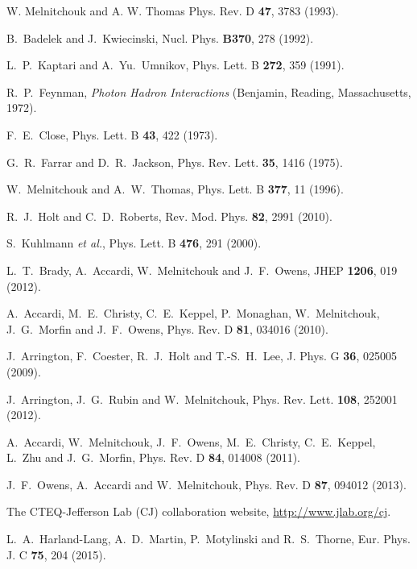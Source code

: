 \documentclass[aps,prd,amsmath,preprint]{revtex4}
\begin{document}
\begin{thebibliography}{99}

W. Melnitchouk and A. W. Thomas
Phys. Rev. D {\bf 47}, 3783 (1993).

B.~Badelek and J.~Kwiecinski,
Nucl. Phys. {\bf B370}, 278 (1992).

L.~P.~Kaptari and A.~Yu.~Umnikov,
Phys. Lett. B {\bf 272}, 359 (1991).

R.~P.~Feynman, {\em Photon Hadron Interactions}
(Benjamin, Reading, Massachusetts, 1972).

F.~E.~Close,
Phys. Lett. B {\bf 43}, 422 (1973).

G.~R.~Farrar and D.~R.~Jackson,
Phys. Rev. Lett. {\bf 35}, 1416 (1975).

W.~Melnitchouk and A.~W.~Thomas,
Phys. Lett. B {\bf 377}, 11 (1996).

R.~J.~Holt and C.~D.~Roberts,
Rev. Mod. Phys. {\bf 82}, 2991 (2010).

S.~Kuhlmann {\it et al.},
Phys. Lett. B {\bf 476}, 291 (2000).

L.~T.~Brady, A.~Accardi, W.~Melnitchouk and J.~F.~Owens,
JHEP {\bf 1206}, 019 (2012).

A.~Accardi, M.~E.~Christy, C.~E.~Keppel, P.~Monaghan, W.~Melnitchouk,
J.~G.~Morfin and J.~F.~Owens,
Phys. Rev. D {\bf 81}, 034016 (2010).

J.~Arrington, F.~Coester, R.~J.~Holt and T.-S.~H.~Lee,
J. Phys. G {\bf 36}, 025005 (2009).

J.~Arrington, J.~G.~Rubin and W.~Melnitchouk,
Phys. Rev. Lett. {\bf 108}, 252001 (2012).

A.~Accardi, W.~Melnitchouk, J.~F.~Owens, M.~E.~Christy, C.~E.~Keppel,
L.~Zhu and J.~G.~Morfin,
Phys. Rev. D {\bf 84}, 014008 (2011).

J.~F.~Owens, A.~Accardi and W.~Melnitchouk,
Phys. Rev. D {\bf 87}, 094012 (2013).

The CTEQ-Jefferson Lab (CJ) collaboration website,
\url{http://www.jlab.org/cj}.

L.~A.~Harland-Lang, A.~D.~Martin, P.~Motylinski and R.~S.~Thorne,
Eur. Phys. J. C {\bf 75}, 204 (2015).



\end{thebibliography}
\end{document}
